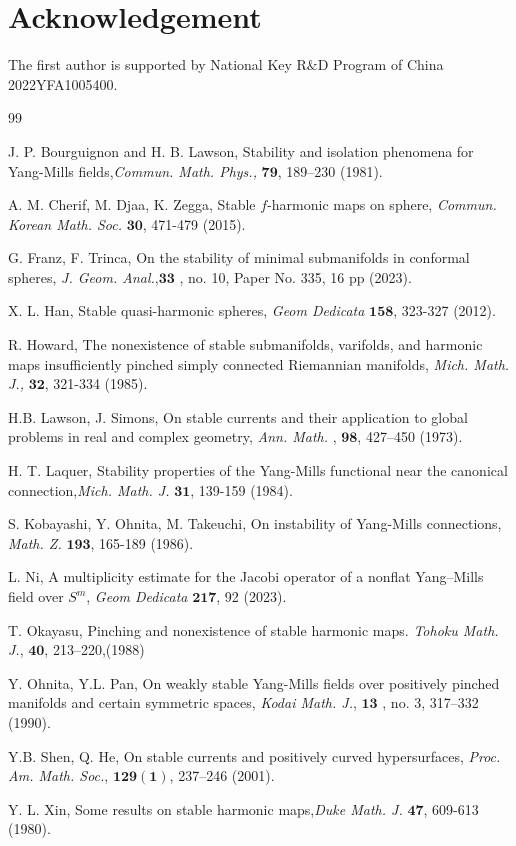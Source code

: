 \documentclass{amsart}
\begin{document}
	\section*{Acknowledgement}
	
	The first author is supported by National Key R$\&$D Program of China 2022YFA1005400.
	
	\begin{thebibliography}{99}
		
		
		J. P. Bourguignon and H. B. Lawson, Stability and isolation phenomena for Yang-Mills fields,\emph{Commun. Math. Phys.,} $\mathbf{79}$, 189–230 (1981).
		
		 A. M. Cherif, M. Djaa, K. Zegga, Stable $f$-harmonic maps on sphere, \emph{Commun. Korean Math. Soc.} $\mathbf{30}$, 471-479 (2015).
		
		 G. Franz,  F. Trinca, On the stability of minimal submanifolds in conformal spheres, \emph{ J. Geom. Anal.},$\mathbf{33}$ , no. 10, Paper No. 335, 16 pp (2023). 
		
		 X. L. Han, Stable quasi-harmonic spheres,  \emph{Geom Dedicata} $\mathbf{158}$, 323-327 (2012).
		
		 R. Howard, The nonexistence of stable submanifolds, varifolds, and harmonic maps insufficiently pinched simply connected Riemannian manifolds, \emph{Mich. Math. J.,} $\mathbf{32}$, 321-334  (1985).
		
		 H.B. Lawson, J. Simons, On stable currents and their application to global problems in real and complex geometry, \emph{Ann. Math. }, $\mathbf{98}$, 427–450 (1973).
		
		 H. T. Laquer, Stability properties of the Yang-Mills functional near the canonical connection,\emph{Mich. Math. J.} $\mathbf{31}$, 139-159 (1984).
		
		 S. Kobayashi, Y. Ohnita, M. Takeuchi, On instability of Yang-Mills connections, \emph{Math. Z.} $\mathbf{193}$, 165-189 (1986).
		
		 L. Ni, A multiplicity estimate for the Jacobi operator of a nonflat Yang–Mills field over $S^m$, \emph{Geom Dedicata} $\mathbf{217}$, 92 (2023).
		
		 T. Okayasu, Pinching and nonexistence of stable harmonic maps. \emph{Tohoku Math. J.}, $\mathbf {40}$, 213–220,(1988)
		
		 Y. Ohnita, Y.L. Pan,  On weakly stable Yang-Mills fields over positively pinched manifolds and certain symmetric spaces, \emph{Kodai Math. J.}, $\mathbf{13}$ , no. 3, 317–332  (1990).
		
		
		 Y.B. Shen, Q. He, On stable currents and positively curved hypersurfaces, \emph{Proc. Am. Math. Soc.},
		$\mathbf{129(1)}$, 237–246 (2001).
		
		
		
		 Y. L. Xin, Some results on stable harmonic maps,\emph{Duke Math. J.} $\mathbf{47}$, 609-613 (1980).
		
	\end{thebibliography}
\end{document}
